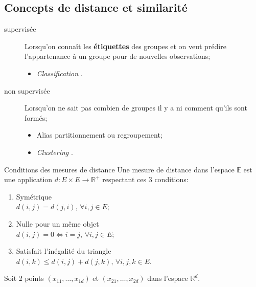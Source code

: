 \documentclass[10pt, french]{article}
\begin{document}
\begin{multicols*}{3}
\subsection*{Concepts de distance et similarité}

\begin{definitionNOHFILL}[Classification]
\begin{description}
	\item[supervisée]	Lorsqu'on connaît les \textbf{étiquettes} des groupes et on veut prédire l'appartenance à un groupe pour de nouvelles observations;
		\begin{itemize}[leftmargin = *] 
		\item	\og \textit{Classification} \fg{}.
		\end{itemize}
	\item[non supervisée]	Lorsqu'on ne sait pas combien de groupes il y a ni comment qu'ils sont formés;
		\begin{itemize}[leftmargin = *]
		\item	Alias partitionnement ou regroupement;
		\item	\og \textit{Clustering} \fg{}.
		\end{itemize}
\end{description}
\end{definitionNOHFILL}

\begin{conceptgen}{Conditions des mesures de distance}
Une mesure de distance dans l'espace $\mathbb{E}$ est une application $d : E \times E \rightarrow \mathbb{R}^{+}$ respectant ces 3 conditions:
\begin{enumerate}[leftmargin = *]
	\item	Symétrique\\
	$d(i, j) = d(j, i), \, \forall i, j \in E$;
	\item	Nulle pour un même objet\\
	$d(i, j) = 0 \Leftrightarrow i = j, \, \forall i, j \in E$;
	\item	Satisfait l'inégalité du triangle\\
	$d(i, k) \le d(i, j) + d(j, k), \, \forall i, j, k \in E$.
\end{enumerate}
\end{conceptgen}

\begin{definitionNOHFILL}
Soit 2 points $(x_{11}, \dots, x_{1d})$ et $(x_{21}, \dots, x_{2d})$ dans l'espace $\mathbb{R}^{d}$.


\end{definitionNOHFILL}
\end{multicols*}
\end{document}
